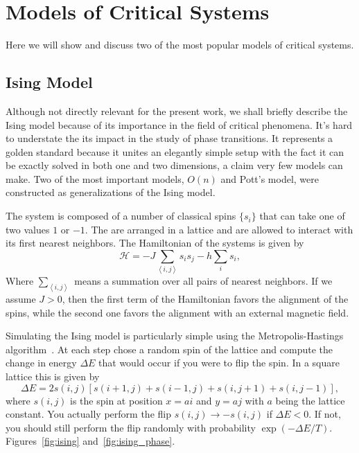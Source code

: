 \section{Models of Critical Systems}
\label{sec:models}

Here we will show and discuss two of the most popular models of critical systems.

\subsection{Ising Model}
\label{sec:ising}

Although not directly relevant for the present work, we shall briefly describe
the Ising model because of its importance in the field of critical phenomena.
It's hard to understate the its impact in the study of phase transitions. It
represents a golden standard because it unites an elegantly simple setup with
the fact it can be exactly solved in both one and two dimensions, a claim very
few models can make. Two of the most important models, $O(n)$ and Pott's model,
were constructed as generalizations of the Ising model.

The system is composed of a number of classical spins $\{s_i\}$ that can take
one of two values $1$ or $-1$. The are arranged in a lattice and are allowed to
interact with its first nearest neighbors. The Hamiltonian of the systems is
given by
\begin{equation}
    \mathcal{H}=
    -J\sum_{\left\langle i,j\right\rangle }s_{i}s_{j}
    -h\sum_{i}s_{i},
\end{equation}
Where $\sum_{\left\langle i,j\right\rangle}$ means a summation over all pairs
of nearest neighbors. If we assume $J>0$, then the first term of the
Hamiltonian favors the alignment of the spins, while the second one 
favors the alignment with an external magnetic field.

Simulating the Ising model is particularly simple using the Metropolis-Hastings
algorithm~\cite{Hastings1970}. At each step chose a random spin of the lattice
and compute the change in energy $\Delta E$ that would occur if you were to
flip the spin. In a square lattice this is given by
\begin{equation}
    \Delta E=2s\left(i,j\right)\left[s\left(i+1,j\right)+
    s\left(i-1,j\right)+s\left(i,j+1\right)+s\left(i,j-1\right)\right],
\end{equation}
where $s(i,j)$ is the spin at position $x=ai$ and $y=aj$ with $a$ being the
lattice constant. You actually perform the flip $s(i,j)\rightarrow -s(i,j)$ if
$\Delta E < 0$. If not, you should still perform the flip randomly with
probability $\exp(-\Delta E / T)$. Figures~\ref{fig:ising}
and~\ref{fig:ising_phase}.

